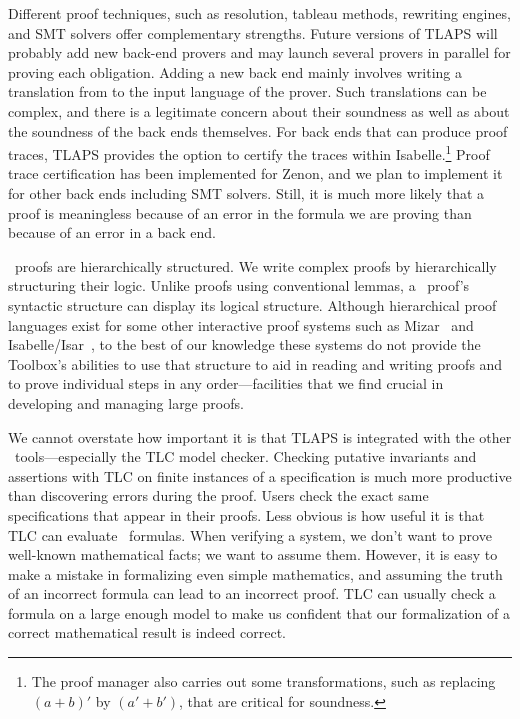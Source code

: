 \documentclass[a4paper]{llncs}
\begin{document}
Different proof techniques, such as resolution, tableau methods,
rewriting engines, and SMT solvers offer complementary strengths.
Future versions of TLAPS will probably add new back-end provers and
may launch several provers in parallel for proving each obligation.
Adding a new back end mainly involves writing a translation from
\tlaplus to the input language of the prover.  Such
translations can be complex, and there is a legitimate concern about
their soundness as well as about the soundness of the back ends
themselves.  For back ends that can produce proof traces, TLAPS
provides the option to certify the traces within Isabelle.\footnote{The
proof manager also carries out some transformations, such
  as replacing $(a+b)'$ by $(a'+b')$,
that are critical for soundness.} 
% 
Proof trace certification has been implemented for Zenon,
and we plan to implement it for other back ends including SMT
solvers.  Still, it is much more likely that a proof is meaningless
because of an error in the formula we are proving than because of
an error in a back end.


\tlaplus\ proofs are hierarchically structured.  We write complex
proofs by hierarchically structuring their logic.  Unlike proofs using
conventional lemmas, a \tlaplus\ proof's syntactic structure can
display its logical structure.  Although hierarchical proof languages
exist for some other interactive proof systems such as
Mizar~\cite{trybulec:mizar} and Isabelle/Isar~\cite{wenzel:isar}, to
the best of our knowledge these systems do not provide the Toolbox's
abilities to use that structure to aid in reading and writing proofs and to prove
individual steps in any order---facilities that we find crucial in developing
and managing large proofs.

We cannot overstate how important it is that TLAPS is integrated with
the other \tlaplus\ tools---especially the TLC model checker.
Checking putative invariants and assertions with TLC on finite
instances of a specification is much more productive than discovering
errors during the proof.  
Users check the exact same specifications that
appear in their proofs.  Less obvious is how useful it is that TLC can
evaluate \tlaplus\ formulas.  When verifying a system, we don't
want to prove well-known mathematical facts; we want to assume them.
However, it is easy to make a mistake in formalizing even simple
mathematics, and assuming the truth of an incorrect formula can lead
to an incorrect proof.  TLC can usually check a formula on a large
enough model to make us confident that our formalization of a correct
mathematical result is indeed correct.
\end{document}
